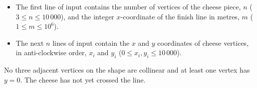 

\begin{itemize}
  \item The first line of input contains the number of vertices of the cheese piece, $n$ ($3 \le n \le 10\,000$),
        and the integer $x$-coordinate of the finish line in metres, $m$ ($1 \le m \le 10^6$).

  \item The next $n$ lines of input contain the $x$ and $y$ coordinates of cheese vertices, in anti-clockwise order,
        $x_i$ and $y_i$ ($0 \le x_i, y_i \le 10\,000$).
\end{itemize}

No three adjacent vertices on the shape are collinear and at least one vertex has $y = 0$.
The cheese has not yet crossed the line.

